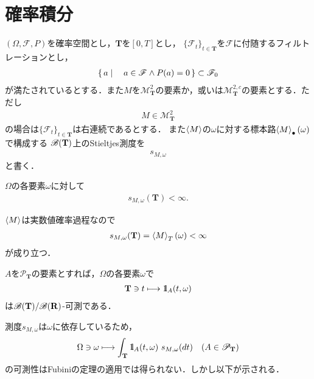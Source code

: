 \section{確率積分}
	$(\Omega,\mathscr{F},P)$を確率空間とし，$\mathbf{T}$を$[0,T]$とし，
	$\{\mathscr{F}_t\}_{t \in \mathbf{T}}$を$\mathscr{F}$に付随するフィルトレーションとし，
	\begin{align}
		\left\{\, a \mid \quad a \in \mathscr{F} \wedge P(a) = 0\, \right\} \subset \mathscr{F}_0
	\end{align}
	が満たされているとする．また$M$を$\mathscr{M}^2_{\mathbf{T}}$の要素か，或いは$\mathscr{M}^{2,c}_{\mathbf{T}}$の要素とする．ただし
	\begin{align}
		M \in \mathscr{M}^2_{\mathbf{T}}
	\end{align}
	の場合は$\{\mathscr{F}_t\}_{t \in \mathbf{T}}$は右連続であるとする．
	また$\inprod<M>$の$\omega$に対する標本路$\inprod<M>_\bullet(\omega)$で構成する
	$\mathscr{B}(\mathbf{T})$上のStieltjes測度を
	\begin{align}
		s_{M,\omega}
	\end{align}
	と書く．
	
	\begin{screen}
		\begin{thm}
			$\Omega$の各要素$\omega$に対して
			\begin{align}
				s_{M,\omega}(\mathbf{T}) < \infty.
			\end{align}
		\end{thm}
	\end{screen}
	
	\begin{prf}
		$\inprod<M>$は実数値確率過程なので
		\begin{align}
			s_{M,\omega}(\mathbf{T}) = \inprod<M>_T(\omega) < \infty
		\end{align}
		が成り立つ．
		\QED
	\end{prf}
	
	\begin{screen}
		\begin{thm}
			$A$を$\mathscr{P}_{\mathbf{T}}$の要素とすれば，$\Omega$の各要素$\omega$で
			\begin{align}
				\mathbf{T} \ni t \longmapsto \mbox{1}\hspace{-0.25em}\mbox{l}_A(t,\omega)
			\end{align}
			は$\mathscr{B}(\mathbf{T})/\mathscr{B}(\mathbf{R})$-可測である．
		\end{thm}
	\end{screen}
	
	測度$s_{M,\omega}$は$\omega$に依存しているため，
	\begin{align}
		\Omega \ni \omega \longmapsto \int_{\mathbf{T}} \mbox{1}\hspace{-0.25em}\mbox{l}_A(t,\omega)\ s_{M,\omega}(dt)
		\quad (A \in \mathscr{P}_{\mathbf{T}})
	\end{align}
	の可測性はFubiniの定理の適用では得られない．しかし以下が示される．
	
